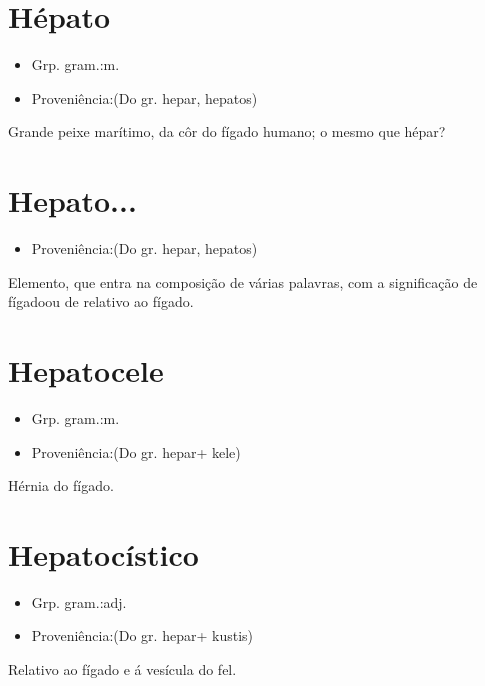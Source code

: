 \documentclass{article}
\begin{document}
\section{Hépato}
\begin{itemize}
\item {Grp. gram.:m.}
\end{itemize}
\begin{itemize}
\item {Proveniência:(Do gr. \textunderscore hepar\textunderscore , \textunderscore hepatos\textunderscore )}
\end{itemize}
Grande peixe marítimo, da côr do fígado humano; o mesmo que \textunderscore hépar\textunderscore ?
\section{Hepato...}
\begin{itemize}
\item {Proveniência:(Do gr. \textunderscore hepar\textunderscore , \textunderscore hepatos\textunderscore )}
\end{itemize}
Elemento, que entra na composição de várias palavras, com a significação de \textunderscore fígado\textunderscore  ou de \textunderscore relativo ao fígado\textunderscore .
\section{Hepatocele}
\begin{itemize}
\item {Grp. gram.:m.}
\end{itemize}
\begin{itemize}
\item {Proveniência:(Do gr. \textunderscore hepar\textunderscore  + \textunderscore kele\textunderscore )}
\end{itemize}
Hérnia do fígado.
\section{Hepatocístico}
\begin{itemize}
\item {Grp. gram.:adj.}
\end{itemize}
\begin{itemize}
\item {Proveniência:(Do gr. \textunderscore hepar\textunderscore  + \textunderscore kustis\textunderscore )}
\end{itemize}
Relativo ao fígado e á vesícula do fel.
\end{document}
